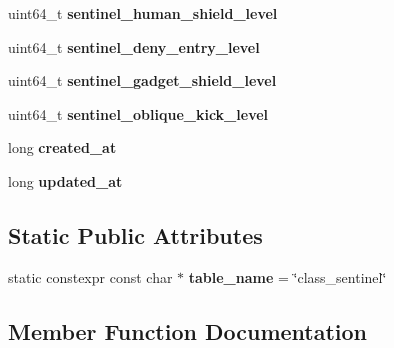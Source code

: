 \begin{DoxyCompactItemize}
\mbox{\label{structmods_1_1orm_1_1sentinel_a1cec1d768af77adf7cf192e884a7a03d}} 
uint64\+\_\+t {\bfseries sentinel\+\_\+human\+\_\+shield\+\_\+level}
\item 
\mbox{\label{structmods_1_1orm_1_1sentinel_a6cd882ed327e0d8eeaaf7a7d6d9b9ab2}} 
uint64\+\_\+t {\bfseries sentinel\+\_\+deny\+\_\+entry\+\_\+level}
\item 
\mbox{\label{structmods_1_1orm_1_1sentinel_a178b373bcaf8fd30a4f6325b5188ff22}} 
uint64\+\_\+t {\bfseries sentinel\+\_\+gadget\+\_\+shield\+\_\+level}
\item 
\mbox{\label{structmods_1_1orm_1_1sentinel_a08fa15298db1ff7b8c50989ae2649a34}} 
uint64\+\_\+t {\bfseries sentinel\+\_\+oblique\+\_\+kick\+\_\+level}
\item 
\mbox{\label{structmods_1_1orm_1_1sentinel_a1a761a3d983e8bc6353d955285f13f28}} 
long {\bfseries created\+\_\+at}
\item 
\mbox{\label{structmods_1_1orm_1_1sentinel_a19401c12257cd5faf59939e8f70e6fbb}} 
long {\bfseries updated\+\_\+at}
\end{DoxyCompactItemize}
\subsection*{Static Public Attributes}
\begin{DoxyCompactItemize}
\item 
\mbox{\label{structmods_1_1orm_1_1sentinel_a2bf880a2f876fcbb2d76a78babde4bbf}} 
static constexpr const char $\ast$ {\bfseries table\+\_\+name} = \char`\"{}class\+\_\+sentinel\char`\"{}
\end{DoxyCompactItemize}


\subsection{Member Function Documentation}
\mbox{\label{structmods_1_1orm_1_1sentinel_aa01c7770d384a6461a7d886e1ac94d03}} 
